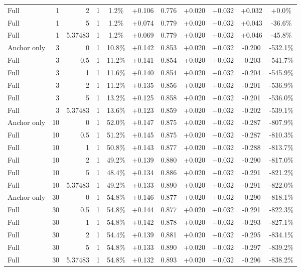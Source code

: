 \begin{table}[htbp]
\begin{tabular}{lrrrccccccc}
Full & 1 & 2 & 1 & 1.2\% & +0.106 & 0.776 & +0.020 & +0.032 & +0.032 & +0.0\% \\
Full & 1 & 5 & 1 & 1.2\% & +0.074 & 0.779 & +0.020 & +0.032 & +0.043 & -36.6\% \\
Full & 1 & 5.37483 & 1 & 1.2\% & +0.069 & 0.779 & +0.020 & +0.032 & +0.046 & -45.8\% \\
Anchor only & 3 & 0 & 1 & 10.8\% & +0.142 & 0.853 & +0.020 & +0.032 & -0.200 & -532.1\% \\
Full & 3 & 0.5 & 1 & 11.2\% & +0.141 & 0.854 & +0.020 & +0.032 & -0.203 & -541.7\% \\
Full & 3 & 1 & 1 & 11.6\% & +0.140 & 0.854 & +0.020 & +0.032 & -0.204 & -545.9\% \\
Full & 3 & 2 & 1 & 11.2\% & +0.135 & 0.856 & +0.020 & +0.032 & -0.201 & -536.9\% \\
Full & 3 & 5 & 1 & 13.2\% & +0.125 & 0.858 & +0.020 & +0.032 & -0.201 & -536.0\% \\
Full & 3 & 5.37483 & 1 & 13.6\% & +0.123 & 0.859 & +0.020 & +0.032 & -0.202 & -539.1\% \\
Anchor only & 10 & 0 & 1 & 52.0\% & +0.147 & 0.875 & +0.020 & +0.032 & -0.287 & -807.9\% \\
Full & 10 & 0.5 & 1 & 51.2\% & +0.145 & 0.875 & +0.020 & +0.032 & -0.287 & -810.3\% \\
Full & 10 & 1 & 1 & 50.8\% & +0.143 & 0.877 & +0.020 & +0.032 & -0.288 & -813.7\% \\
Full & 10 & 2 & 1 & 49.2\% & +0.139 & 0.880 & +0.020 & +0.032 & -0.290 & -817.0\% \\
Full & 10 & 5 & 1 & 48.4\% & +0.134 & 0.886 & +0.020 & +0.032 & -0.291 & -821.2\% \\
Full & 10 & 5.37483 & 1 & 49.2\% & +0.133 & 0.890 & +0.020 & +0.032 & -0.291 & -822.0\% \\
Anchor only & 30 & 0 & 1 & 54.8\% & +0.146 & 0.877 & +0.020 & +0.032 & -0.290 & -818.1\% \\
Full & 30 & 0.5 & 1 & 54.8\% & +0.144 & 0.877 & +0.020 & +0.032 & -0.291 & -822.3\% \\
Full & 30 & 1 & 1 & 54.8\% & +0.142 & 0.878 & +0.020 & +0.032 & -0.293 & -827.1\% \\
Full & 30 & 2 & 1 & 54.4\% & +0.139 & 0.881 & +0.020 & +0.032 & -0.295 & -834.1\% \\
Full & 30 & 5 & 1 & 54.8\% & +0.133 & 0.890 & +0.020 & +0.032 & -0.297 & -839.2\% \\
Full & 30 & 5.37483 & 1 & 54.8\% & +0.132 & 0.893 & +0.020 & +0.032 & -0.296 & -838.2\% \\

\end{tabular}
\end{table}

